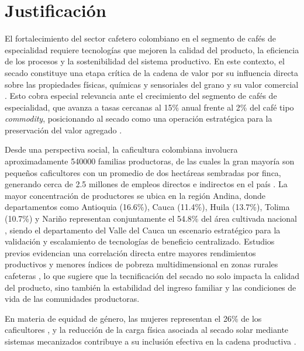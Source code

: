 \section{Justificación}

El fortalecimiento del sector cafetero colombiano en el segmento de cafés de 
especialidad requiere tecnologías que mejoren la calidad del producto, la eficiencia 
de los procesos y la sostenibilidad del sistema productivo. En este contexto, el secado 
constituye una etapa crítica de la cadena de valor por su influencia directa sobre las 
propiedades físicas, químicas y sensoriales del grano y su valor comercial 
\parencite{abreu_influence_2025}. Esto cobra especial relevancia ante el crecimiento 
del segmento de cafés de especialidad, que avanza a tasas cercanas al 15\% anual frente 
al 2\% del café tipo \textit{commodity}, posicionando al secado como una operación 
estratégica para la preservación del valor agregado \parencite{barbosa_sensory_2019}.

Desde una perspectiva social, la caficultura colombiana involucra aproximadamente 
540000 familias productoras, de las cuales la gran mayoría son pequeños caficultores 
con un promedio de dos hectáreas sembradas por finca, generando cerca de 2.5 millones 
de empleos directos e indirectos en el país \parencite{betancourt_agricultural_2024, tabarquino_munoz_cadena_2025}. La mayor 
concentración de productores se ubica en la región Andina, donde departamentos como 
Antioquia (16.6\%), Cauca (11.4\%), Huila (13.7\%), Tolima (10.7\%) y Nariño representan 
conjuntamente el 54.8\% del área cultivada nacional \parencite{betancourt_agricultural_2024, tabarquino_munoz_cadena_2025, navarro_munoz_sector_2024}, 
siendo el departamento del Valle del Cauca un escenario estratégico para la 
validación y escalamiento de tecnologías de beneficio centralizado. Estudios previos evidencian una correlación directa 
entre mayores rendimientos productivos y menores índices de pobreza multidimensional 
en zonas rurales cafeteras \parencite{betancourt_agricultural_2024}, lo que sugiere que la 
tecnificación del secado no solo impacta la calidad del producto, sino también la 
estabilidad del ingreso familiar y las condiciones de vida de las comunidades 
productoras.

En materia de equidad de género, las mujeres representan el 26\% de los 
caficultores \parencite{navarro_munoz_sector_2024}, y la reducción de la carga física 
asociada al secado solar mediante sistemas mecanizados contribuye a su inclusión 
efectiva en la cadena productiva \parencite{tabarquino_munoz_cadena_2025, betancourt_agricultural_2024}.

